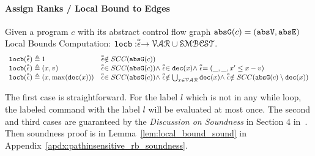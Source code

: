 \paragraph*{Assign Ranks / Local Bound to Edges}
\begin{defn}
  \label{def:lbgen}
Given a program $c$ with its abstract control flow graph 
$\absG(c) = (\absV, \absE)$
\\
Local Bounds Computation:
$\locbound: \absevent \to \mathcal{VAR} \cup \constdom$.
%
\[ 
\begin{array}{ll}
  \locbound(\absevent) \triangleq 1 
  & \absevent \notin SCC(\absG(c))
  \\
  \locbound(\absevent) \triangleq (x, v) 
  & \absevent \in SCC(\absG(c)) \land \absevent \in \dec(x) \land  \absevent = (\_, \_ , x' \leq x - v) \\
  \locbound(\absevent) \triangleq (x, \max(\dec(x))) 
  & \absevent \in SCC(\absG(c)) \land 
  \absevent  \notin \bigcup_{x \in \mathcal{VAR}} \dec(x)
  \land \absevent \notin SCC(\absG(c) \setminus \dec(x)) 
\end{array}
  \]
\end{defn}
  The first case is straightforward. 
  For the label $l$ which is not in any while loop, 
  the labeled command with the label $l$ will be 
  evaluated at most once. 
  The second and third cases are guaranteed by the \emph{Discussion on Soundness} in Section 4 in~\cite{sinn2017complexity}.
  Then soundness proof is in Lemma~\ref{lem:local_bound_sound} in Appendix~\ref{apdx:pathinsensitive_rb_soundness}.
%
